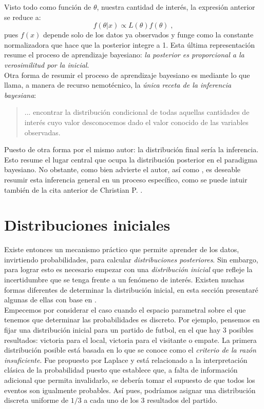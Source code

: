 Visto todo como función de $\theta$, nuestra cantidad de interés, la expresión anterior se reduce a:  
\begin{equation} \label{eq:Bayes_Prop}
f(\theta|x) \propto L(\theta)f(\theta)\;,
\end{equation}
pues $f(x)$ depende solo de los datos ya observados y funge como la constante normalizadora que hace que la posterior integre a 1. Esta última representación resume el proceso de aprendizaje bayesiano: \textit{la posterior es proporcional a la verosimilitud por la inicial}.\\ 

Otra forma de resumir el proceso de aprendizaje bayesiano es mediante lo que \textcite{GP16} llama, a manera de recurso nemotécnico, la \textit{única receta de la inferencia bayesiana}\label{receta_bayesiana}:
\begin{quote}
... encontrar la distribución condicional de todas aquellas cantidades de interés cuyo valor desconocemos dado el valor conocido de las variables observadas.
\end{quote}
Puesto de otra forma por el mismo autor: la distribución final sería la inferencia. Esto resume el lugar central que ocupa la distribución posterior en el paradigma bayesiano. No obstante, como bien advierte el autor, así como \textcite{Berger85}, es deseable resumir esta inferencia general en un proceso específico, como se puede intuir también de la cita anterior de Christian P. \textcite{Robert07}. 

\section{Distribuciones iniciales}

Existe entonces un mecanismo práctico que permite aprender de los datos, invirtiendo probabilidades, para calcular \textit{distribuciones posteriores}. Sin embargo, para lograr esto es necesario empezar con una \textit{distribución inicial} que refleje la incertidumbre que se tenga frente a un fenómeno de interés. Existen muchas formas diferentes de determinar la distribución inicial, en esta sección presentaré algunas de ellas con base en \textcites{Berger85,Congdon06,Robert07,Gelman13}.\\ 

Empecemos por considerar el caso cuando el espacio parametral sobre el que tenemos que determinar las probabilidades es discreto. Por ejemplo, pensemos en fijar una distribución inicial para un partido de futbol, en el que hay 3 posibles resultados: victoria para el local, victoria para el visitante o empate. La primera distribución posible está basada en lo que se conoce como el \textit{criterio de la razón insuficiente}. Fue propuesto por Laplace y está relacionado a la interpretación clásica de la probabilidad puesto que establece que, a falta de información adicional que permita invalidarlo, se debería tomar el supuesto de que todos los eventos son igualmente probables. Así pues, podríamos asignar una distribución discreta uniforme de $1/3$ a cada uno de los 3 resultados del partido.\\


